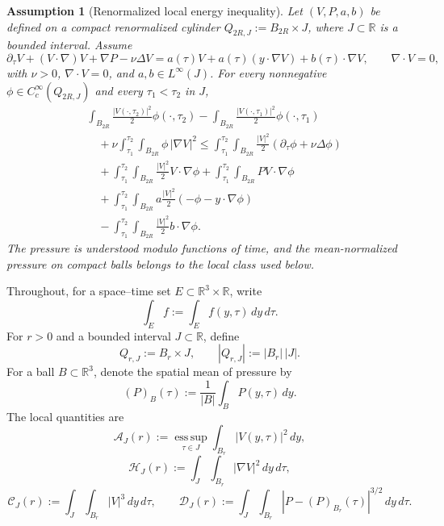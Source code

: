 \documentclass[11pt]{amsart}
\theoremstyle{plain}
\newtheorem{assumption}[theorem]{Assumption}
\theoremstyle{definition}
\theoremstyle{remark}
\begin{document}
\begin{assumption}[Renormalized local energy inequality]\label{ass:lei}
Let $(V,P,a,b)$ be defined on a compact renormalized cylinder
$Q_{2R,J}:=B_{2R}\times J$, where $J\subset\mathbb R$ is a bounded interval.
Assume
\begin{equation}\label{eq:renorm-ns}
\partial_\tau V+(V\cdot\nabla)V+\nabla P-\nu\Delta V
= a(\tau)V+a(\tau)(y\cdot\nabla V)+b(\tau)\cdot\nabla V,
\qquad
\nabla\cdot V=0,
\end{equation}
with $\nu>0$, $\nabla\cdot V=0$, and $a,b\in L^\infty(J)$. For every
nonnegative $\phi\in C_c^\infty(Q_{2R,J})$ and every $\tau_1<\tau_2$ in $J$,
\begin{equation}\label{eq:local-energy}
\begin{aligned}
&\int_{B_{2R}}\frac{|V(\cdot,\tau_2)|^2}{2}\phi(\cdot,\tau_2)
-\int_{B_{2R}}\frac{|V(\cdot,\tau_1)|^2}{2}\phi(\cdot,\tau_1)
\\
&\quad+\nu\int_{\tau_1}^{\tau_2}\!\int_{B_{2R}}\phi\,|\nabla V|^2
\le
\int_{\tau_1}^{\tau_2}\!\int_{B_{2R}}\frac{|V|^2}{2}(\partial_\tau\phi+\nu\Delta\phi)
\\
&\quad+\int_{\tau_1}^{\tau_2}\!\int_{B_{2R}}\frac{|V|^2}{2}V\cdot\nabla\phi
+\int_{\tau_1}^{\tau_2}\!\int_{B_{2R}}PV\cdot\nabla\phi
\\
&\quad+\int_{\tau_1}^{\tau_2}\!\int_{B_{2R}}
a\frac{|V|^2}{2}(-\phi-y\cdot\nabla\phi)
\\
&\quad-\int_{\tau_1}^{\tau_2}\!\int_{B_{2R}}\frac{|V|^2}{2}b\cdot\nabla\phi.
\end{aligned}
\end{equation}
The pressure is understood modulo functions of time, and the mean-normalized
pressure on compact balls belongs to the local class used below.
\end{assumption}

Throughout, for a space--time set $E\subset\mathbb R^3\times\mathbb R$, write
\[
\int_E f:=\int_E f(y,\tau)\,dy\,d\tau.
\]
For $r>0$ and a bounded interval $J\subset\mathbb R$, define
\[
Q_{r,J}:=B_r\times J,\qquad |Q_{r,J}|:=|B_r|\,|J|.
\]
For a ball $B\subset\mathbb R^3$, denote the spatial mean of pressure by
\[
(P)_B(\tau):=\frac1{|B|}\int_B P(y,\tau)\,dy.
\]
The local quantities are
\[
\mathcal A_J(r):=\operatorname*{ess\,sup}_{\tau\in J}\int_{B_r}|V(y,\tau)|^2\,dy,
\]
\[
\mathcal H_J(r):=\int_J\!\int_{B_r}|\nabla V|^2\,dy\,d\tau,
\]
\[
\mathcal C_J(r):=\int_J\!\int_{B_r}|V|^3\,dy\,d\tau,
\qquad
\mathcal D_J(r):=\int_J\!\int_{B_r}|P-(P)_{B_r}(\tau)|^{3/2}\,dy\,d\tau.
\]
\end{document}
